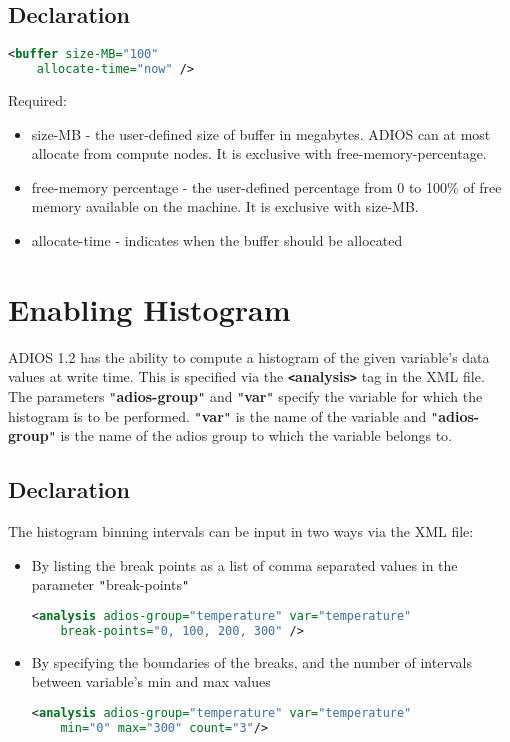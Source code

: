 \subsection{Declaration}
\begin{lstlisting}[language=XML]
<buffer size-MB="100"
    allocate-time="now" />
\end{lstlisting}

Required:
\begin{itemize}
\item size-MB - the user-defined size of  buffer in megabytes. ADIOS can at most allocate 
from compute nodes. It is exclusive with free-memory-percentage.
\item free-memory percentage - the user-defined percentage from 0 to 100\% of free memory 
available on the machine. It is exclusive with size-MB.
\item allocate-time - indicates when the buffer should be allocated
\end{itemize}

\section{Enabling Histogram}

ADIOS 1.2 has the ability to {\color{color01} compute a histogram of the given 
variable's data values at write time}. This is specified via the \textbf{\texttt{<}analysis\texttt{>}} 
tag in the XML file. The parameters \texttt{"}\textbf{adios-group}\texttt{"} and 
\texttt{"}\textbf{var}\texttt{"} specify the variable for which the histogram is 
to be performed. \texttt{"}\textbf{var}\texttt{"} is the name of the variable and 
\texttt{"}\textbf{adios-group}\texttt{"} is the name of the adios group to which 
the variable belongs to.

\subsection{Declaration}
The histogram binning intervals can be input in two ways via the XML file:
\begin{itemize}
\item By listing the break points as a list of comma separated values 
in the parameter \texttt{"}break-points\texttt{"} 
\begin{lstlisting}[language=XML]
<analysis adios-group="temperature" var="temperature"
    break-points="0, 100, 200, 300" />
\end{lstlisting}

\item By specifying the boundaries of the breaks, and the number 
of intervals between variable's min and max values
\begin{lstlisting}[language=XML]
<analysis adios-group="temperature" var="temperature"
    min="0" max="300" count="3"/>
\end{lstlisting}
\end{itemize}

